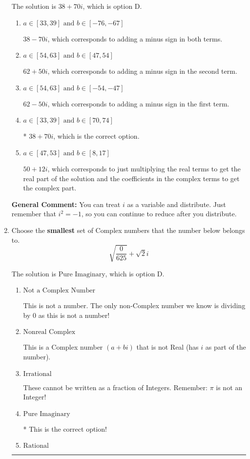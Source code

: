 \documentclass{extbook}[14pt]
\newcommand{\litem}[1]{\item #1

\rule{\textwidth}{0.4pt}}
\begin{document}
\begin{enumerate}
{The solution is \( 38 + 70 i \), which is option D.\begin{enumerate}[label=\Alph*.]
\item \( a \in [33, 39] \text{ and } b \in [-76, -67] \)

 $38 - 70 i$, which corresponds to adding a minus sign in both terms.
\item \( a \in [54, 63] \text{ and } b \in [47, 54] \)

 $62 + 50 i$, which corresponds to adding a minus sign in the second term.
\item \( a \in [54, 63] \text{ and } b \in [-54, -47] \)

 $62 - 50 i$, which corresponds to adding a minus sign in the first term.
\item \( a \in [33, 39] \text{ and } b \in [70, 74] \)

* $38 + 70 i$, which is the correct option.
\item \( a \in [47, 53] \text{ and } b \in [8, 17] \)

 $50 + 12 i$, which corresponds to just multiplying the real terms to get the real part of the solution and the coefficients in the complex terms to get the complex part.
\end{enumerate}

\textbf{General Comment:} You can treat $i$ as a variable and distribute. Just remember that $i^2=-1$, so you can continue to reduce after you distribute.
}
\litem{
Choose the \textbf{smallest} set of Complex numbers that the number below belongs to.
\[ \sqrt{\frac{0}{625}}+\sqrt{2}i \]

The solution is \( \text{Pure Imaginary} \), which is option D.\begin{enumerate}[label=\Alph*.]
\item \( \text{Not a Complex Number} \)

This is not a number. The only non-Complex number we know is dividing by 0 as this is not a number!
\item \( \text{Nonreal Complex} \)

This is a Complex number $(a+bi)$ that is not Real (has $i$ as part of the number).
\item \( \text{Irrational} \)

These cannot be written as a fraction of Integers. Remember: $\pi$ is not an Integer!
\item \( \text{Pure Imaginary} \)

* This is the correct option!
\item \( \text{Rational} \)


\end{enumerate}}
\end{enumerate}
\end{document}
